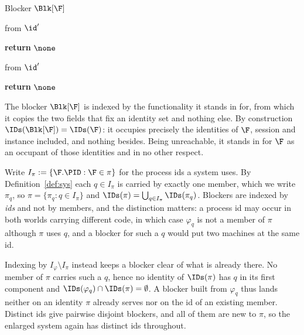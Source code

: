 \documentclass[10pt,oneside,openany]{book}
\theoremstyle{accentdef}
\theoremstyle{accentplain}
\begin{document}
\begin{interface}{Blocker $\Blk[\F]$ \\
}

 \quad from $\id'$
\begin{algorithmic}[1]
\setcounter{contline}{0}\algcont
\State \textbf{return} $\none$
\algsave
\end{algorithmic}

 \quad from $\id'$
\begin{algorithmic}[1]
\algcont
\State \textbf{return} $\none$
\algsave
\end{algorithmic}

\end{interface}

The blocker $\Blk[\F]$ is indexed by the functionality it stands in for, from which it copies the
two fields that fix an identity set and nothing else. By construction
$\IDs(\Blk[\F]) = \IDs(\F)$: it occupies precisely the identities of $\F$, session and instance
included, and nothing besides. Being unreachable, it stands in for $\F$ as an occupant of those
identities and in no other respect.

Write $I_\pi := \{\F.\PID : \F \in \pi\}$ for the process ids a system uses. By
Definition~\ref{def:sys} each $q \in I_\pi$ is carried by exactly one member, which we write
$\pi_q$, so $\pi = \{\pi_q : q \in I_\pi\}$ and $\IDs(\pi) = \bigcup_{q \in I_\pi} \IDs(\pi_q)$.
Blockers are indexed by \emph{ids} and not by members, and the distinction matters: a process id
may occur in both worlds carrying different code, in which case $\varphi_q$ is not a member of
$\pi$ although $\pi$ uses $q$, and a blocker for such a $q$ would put two machines at the same id.

Indexing by $I_\varphi \setminus I_\pi$ instead keeps a blocker clear of what is already there. No
member of $\pi$ carries such a $q$, hence no identity of $\IDs(\pi)$ has $q$ in its first
component and $\IDs(\varphi_q) \cap \IDs(\pi) = \emptyset$. A blocker built from $\varphi_q$ thus
lands neither on an identity $\pi$ already serves nor on the id of an existing member. Distinct ids give pairwise disjoint blockers, and all of them are new to $\pi$, so the
enlarged system again has distinct ids throughout.
\end{document}
